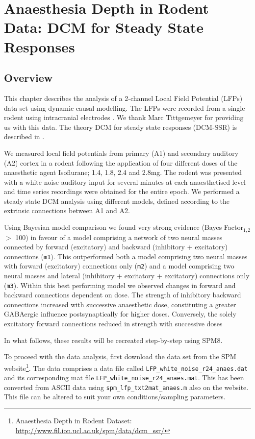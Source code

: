 \chapter{Anaesthesia Depth in Rodent Data: DCM for Steady State Responses \label{chapter:data:dcm_ssr}}

\section{Overview}

This chapter describes the analysis of a 2-channel Local Field Potential (LFPs) data set using dynamic causal modelling. The LFPs were recorded from a single rodent using intracranial electrodes \cite{dcm_ssr_anaesthesia}. We thank Marc Tittgemeyer for providing us with this data. The theory DCM for steady state responses (DCM-SSR) is described in \cite{dcm_ssr}.

We measured local field potentials from primary (A1) and secondary auditory (A2) cortex in a rodent following the application of four different doses of the anaesthetic agent Isoflurane; 1.4, 1.8, 2.4 and 2.8mg. The rodent was presented with a white noise auditory input for several minutes at each anaesthetised level and time series recordings were obtained for the entire epoch. We performed a steady state DCM analysis using different models, defined according to the extrinsic connections between A1 and A2.

Using Bayesian model comparison we found very strong evidence (Bayes Factor$_{1,2}$ $>$ 100) in favour of a model comprising a network of two neural masses connected by forward (excitatory) and backward (inhibitory + excitatory) connections (\texttt{m1}). This outperformed both a model comprising two neural masses with forward (excitatory) connections only (\texttt{m2}) and a model comprising two neural masses and lateral (inhibitory + excitatory + excitatory) connections only (\texttt{m3}). Within this best performing model we observed changes in forward and backward connections dependent on dose. The strength of inhibitory backward connections increased with successive anaesthetic dose, constituting a greater GABAergic influence postsynaptically for higher doses. Conversely, the solely excitatory forward connections reduced in strength with successive doses

In what follows, these results will be recreated step-by-step using SPM8.

To proceed with the data analysis, first download the data set from the SPM website\footnote{Anaesthesia Depth in Rodent Dataset: \url{http://www.fil.ion.ucl.ac.uk/spm/data/dcm_ssr/}}. The data comprises a data file called \texttt{LFP\_white\_noise\_r24\_anaes.dat} and its corresponding mat file \texttt{LFP\_white\_noise\_r24\_anaes.mat}. This has been converted from ASCII data using \texttt{spm\_lfp\_txt2mat\_anaes.m} also on the website. This file can be altered to suit your own conditions/sampling parameters.


